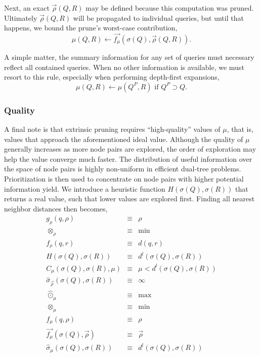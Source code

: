 \documentclass[twoside,leqno,twocolumn]{article}
\newcommand{\summary}{\hat{\sigma}}
\newcommand{\mysubsub}[1]{\subsubsection{#1} }
\newcommand{\kdparent}[1]{#1^{\!P}}
\newcommand{\lo}[1]{#1^{l}}
\newcommand{\distlo}{\lo{d}}
\newcommand{\dist}[2]{d(#1,#2)}
\newcommand{\nameop}[2]{{\scriptstyle\:}#1_{\!#2}}
\newcommand{\myop}[1]{\nameop{\otimes}{#1}}
\newcommand{\letterqr}{\rho}
\newcommand{\inqr}{\rho}
\newcommand{\opqr}{\myop{\letterqr}}
\newcommand{\fqr}{f_{\!\letterqr}}
\newcommand{\gqr}{g_{\!\letterqr}}
\newcommand{\letterqrv}{\vec{\rho}}
\newcommand{\inqrv}{\vec{\rho}}
\newcommand{\deltaqrv}{\summary_{\!\letterqrv}}
\newcommand{\lettermu}{\mu}
\newcommand{\inmu}{\mu}
\newcommand{\outopmu}{\:\widehat{\odot}_{\!\mu}\:}
\newcommand{\opmu}{\myop{\lettermu}}
\newcommand{\fmu}{f_{\!\lettermu}}
\newcommand{\fmuv}{\vec{f_{\!\lettermu}}}
\newcommand{\deltamu}{\summary_{\!\lettermu}}
\newcommand{\canprunemu}{C_{\!\lettermu}}
\newcommand{\heurqr}{H}
\newcommand{\outstat}{\sigma}
\begin{document}
Next, an exact $\inqrv(Q, R)$ may be defined because this computation was pruned.
Ultimately $\inqrv(Q, R)$ will be propagated to individual queries, but until that happens, we bound the prune's worst-case contribution,
\begin{equation}
\inmu(Q, R) \gets \fmuv(\outstat(Q), \inqrv(Q, R)).
\label{eqn:muprune}
\end{equation}

\noindent
A simple matter, the summary information for any set of queries must necessary reflect all contained queries.
When no other information is available, we must resort to this rule, especially when performing depth-first expansions,
\begin{equation}
\inmu(Q, R) \gets \inmu(\kdparent{Q}, R) \text{ if } \kdparent{Q} \supset Q.
\label{eqn:muparent}
\end{equation}

\mysubsub{Quality}
A final note is that extrinsic pruning requires ``high-quality'' values of $\inmu$, that is, values that approach the aforementioned ideal value.
Although the quality of $\inmu$ generally increases as more node pairs are explored, the order of exploration may help the value converge much faster.
The distribution of useful information over the space of node pairs is highly non-uniform in efficient dual-tree problems.
Prioritization is then used to concentrate on node pairs with higher potential information yield.
We introduce a heuristic function $\heurqr(\outstat(Q),\outstat(R))$ that returns a real value, such that lower values are explored first.
Finding all nearest neighbor distances then becomes,
\begin{eqnarray*}
\gqr(q, \inqr) &\equiv& \inqr
\\
\opqr &\equiv& \min
\\
\fqr(q,r) &\equiv& \dist{q}{r}
\\
\heurqr(\outstat(Q),\outstat(R)) &\equiv& \distlo(\outstat(Q), \outstat(R))
\\
\canprunemu(\outstat(Q), \outstat(R), \lettermu)
 &\equiv& \lettermu < \distlo(\outstat(Q), \outstat(R))
\\
\deltaqrv(\outstat(Q),\outstat(R)) &\equiv& \infty
\\
\outopmu &\equiv& \max
\\
\opmu &\equiv& \min
\\
\fmu(q, \letterqr) &\equiv& \letterqr
\\
\fmuv(\outstat(Q), \letterqrv) &\equiv& \letterqrv
\\
\deltamu(\outstat(Q),\outstat(R)) &\equiv& \distlo(\outstat(Q),\outstat(R))
\end{eqnarray*}
\end{document}
